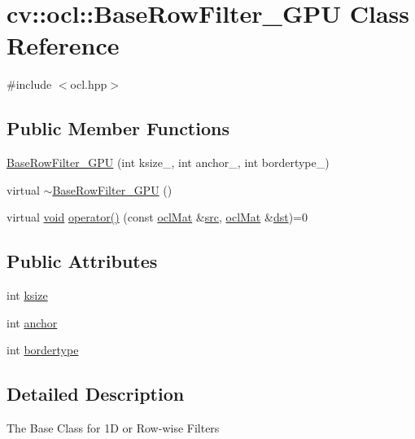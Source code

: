 \hypertarget{classcv_1_1ocl_1_1BaseRowFilter__GPU}{\section{cv\-:\-:ocl\-:\-:Base\-Row\-Filter\-\_\-\-G\-P\-U Class Reference}
\label{classcv_1_1ocl_1_1BaseRowFilter__GPU}
}


{\ttfamily \#include $<$ocl.\-hpp$>$}

\subsection*{Public Member Functions}
\begin{DoxyCompactItemize}
\item 
\hyperlink{classcv_1_1ocl_1_1BaseRowFilter__GPU_a719ddc5f7622dcfd311961020aafe1c2}{Base\-Row\-Filter\-\_\-\-G\-P\-U} (int ksize\-\_\-, int anchor\-\_\-, int bordertype\-\_\-)
\item 
virtual \hyperlink{classcv_1_1ocl_1_1BaseRowFilter__GPU_a32475447b3cbba959e90bbc5d65d0b44}{$\sim$\-Base\-Row\-Filter\-\_\-\-G\-P\-U} ()
\item 
virtual \hyperlink{legacy_8hpp_a8bb47f092d473522721002c86c13b94e}{void} \hyperlink{classcv_1_1ocl_1_1BaseRowFilter__GPU_a542f16509b0643254f09184a2dc1aa5d}{operator()} (const \hyperlink{classcv_1_1ocl_1_1oclMat}{ocl\-Mat} \&\hyperlink{legacy_8hpp_a371cd109b74033bc4366f584edd3dacc}{src}, \hyperlink{classcv_1_1ocl_1_1oclMat}{ocl\-Mat} \&\hyperlink{photo__c_8h_aed13e2a25279b24dc954073233fef7a5}{dst})=0
\end{DoxyCompactItemize}
\subsection*{Public Attributes}
\begin{DoxyCompactItemize}
\item 
int \hyperlink{classcv_1_1ocl_1_1BaseRowFilter__GPU_a517381586af57d704eb40de09bb26dc8}{ksize}
\item 
int \hyperlink{classcv_1_1ocl_1_1BaseRowFilter__GPU_afcfa596ca552ed589b1790579ba7430e}{anchor}
\item 
int \hyperlink{classcv_1_1ocl_1_1BaseRowFilter__GPU_a7ac043fb916dd35d72be54cfbdc2cdcc}{bordertype}
\end{DoxyCompactItemize}


\subsection{Detailed Description}
The Base Class for 1\-D or Row-\/wise Filters

